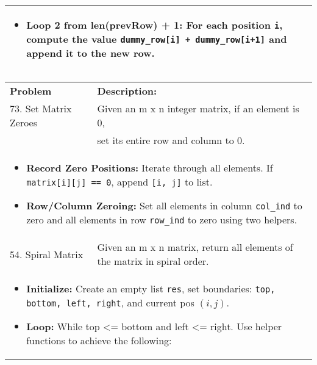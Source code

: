 \begin{summary}
\begin{center}
\begin{tabular}{ll}
{\begin{itemize}
\begin{itemize}
                        \item \textbf{Loop 2 from len(prevRow) + 1:} For each position \texttt{i}, compute the value \texttt{dummy\_row[i] + dummy\_row[i+1]} and append it to the new row. 
                    \end{itemize}
                \end{itemize}                
            } \\
            \bottomrule
        \end{tabular}
    \end{center}
\end{summary}
\newpage

\begin{summary}
    \begin{center}
        \begin{tabular}{ll}
            \toprule
            \textbf{Problem} & \textbf{Description:} \\
            73. Set Matrix Zeroes & Given an m x n integer matrix, if an element is 0, \\
            & set its entire row and column to 0. \\
            \multicolumn{2}{p{\linewidth}}{
                \begin{itemize}                
                    \item \textbf{Record Zero Positions:} Iterate through all elements. If \texttt{matrix[i][j] == 0}, append \texttt{[i, j]} to list.
                    \item \textbf{Row/Column Zeroing:} Set all elements in column \texttt{col\_ind} to zero and all elements in row \texttt{row\_ind} to zero using two helpers.
                \end{itemize}                
            } \\
            \midrule
            54. Spiral Matrix & Given an m x n matrix, return all elements of the matrix in spiral order. \\
            \multicolumn{2}{p{\linewidth}}{
                \begin{itemize}
                    \item \textbf{Initialize:} Create an empty list \texttt{res}, set boundaries: \texttt{top, bottom, left, right}, and current pos $(i,j)$.
                    \item \textbf{Loop:} While top <= bottom and left <= right. Use helper functions to achieve the following: 
                    \begin{itemize}

\end{itemize}
\end{itemize}}
\end{tabular}
\end{center}
\end{summary}
